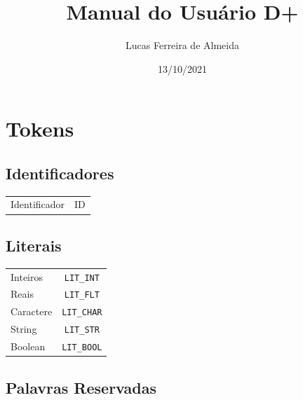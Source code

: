 \documentclass{article}
\title{Manual do Usuário D+}
\author{Lucas Ferreira de Almeida}
\date{13/10/2021}
\begin{document}
\maketitle

\tableofcontents

\pagebreak

\section{Tokens}

\subsection{Identificadores}
\begin{tabular}{ l | c }
   Identificador & ID  \\
\end{tabular}

\subsection{Literais}

\begin{tabular}{ l | c }
 Inteiros & \texttt{LIT\_INT}  \\
 Reais & \texttt{LIT\_FLT}   \\
 Caractere & \texttt{LIT\_CHAR}  \\
 String & \texttt{LIT\_STR}   \\
 Boolean & \texttt{LIT\_BOOL}  \\
\end{tabular}

\subsection{Palavras Reservadas}
\end{document}
